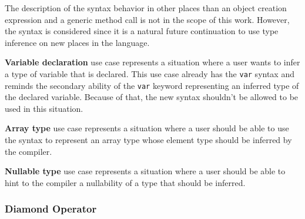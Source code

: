 The description of the syntax behavior in other places than an object creation expression and a generic method call is not in the scope of this work. 
However, the syntax is considered since it is a natural future continuation to use type inference on new places in the language.
\par
\textbf{Variable declaration} use case represents a situation where a user wants to infer a type of variable that is declared. 
This use case already has the \texttt{var} syntax and reminds the secondary ability of the \texttt{var} keyword representing an inferred type of the declared variable. 
Because of that, the new syntax shouldn’t be allowed to be used in this situation.
\par
\textbf{Array type} use case represents a situation where a user should be able to use the syntax to represent an array type whose element type should be inferred by the compiler.
\par
\textbf{Nullable type} use case represents a situation where a user should be able to hint to the compiler a nullability of a type that should be inferred.
\par

\subsubsection{Diamond Operator} 

